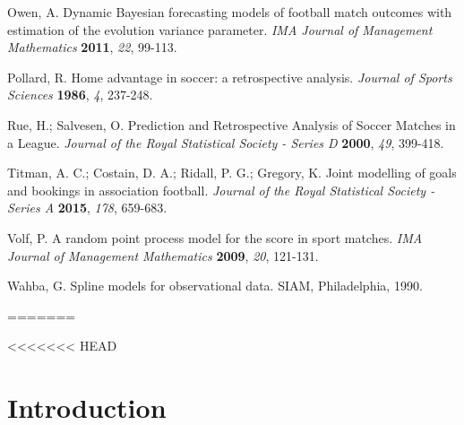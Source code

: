 \documentclass[journal,article,accept,moreauthors,pdftex,12pt,a4paper]{mdpi}
\begin{document}
\begin{thebibliography}{999}
		Owen, A. Dynamic Bayesian forecasting models of football match
		outcomes with estimation of the evolution variance parameter. {\em
			IMA Journal of Management Mathematics} {\bf 2011}, {\em 22}, 99-113.
		
		Pollard, R. Home advantage in soccer: a retrospective analysis. {\em Journal of Sports Sciences} {\bf 1986}, {\em 4}, 237-248.
		
		Rue, H.; Salvesen, O. Prediction and Retrospective Analysis of
		Soccer Matches in a League. {\em Journal of the Royal Statistical
			Society - Series D} {\bf 2000}, {\em 49}, 399-418.
		
		Titman, A. C.; Costain, D. A.; Ridall, P. G.; Gregory, K. Joint
		modelling of goals and bookings in association football. {\em
			Journal of the Royal Statistical Society - Series A} {\bf 2015},
		{\em 178}, 659-683.
		
		Volf, P. A random point process model for the score in sport
		matches. {\em IMA Journal of Management Mathematics} {\bf 2009},
		{\em 20}, 121-131.
		
		Wahba, G. Spline models for observational data. SIAM, Philadelphia,
		1990.
		
	\end{thebibliography}
	
	
	
	
	
	
=======


<<<<<<< HEAD
\section{Introduction}
\end{document}
